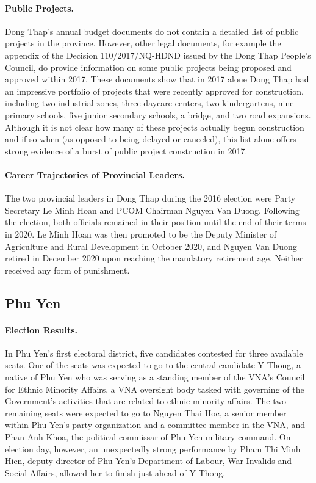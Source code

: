 \documentclass[12pt]{article}
\newcommand{\1}{\mathbbm{1}}
\begin{document}
\paragraph{Public Projects.} Dong Thap's annual budget documents do not contain a detailed list of public projects in the province. However, other legal documents, for example the appendix of the Decision 110/2017/NQ-HDND issued by the Dong Thap People's Council, do provide information on some public projects being proposed and approved within 2017. These documents show that in 2017 alone Dong Thap had an impressive portfolio of projects that were recently approved for construction, including two industrial zones, three daycare centers, two kindergartens, nine primary schools, five junior secondary schools, a bridge, and two road expansions. Although it is not clear how many of these projects actually begun construction and if so when (as opposed to being delayed or canceled), this list alone offers strong evidence of a burst of public project construction in 2017.

\paragraph{Career Trajectories of Provincial Leaders.} The two provincial leaders in Dong Thap during the 2016 election were Party Secretary Le Minh Hoan and PCOM Chairman Nguyen Van Duong. Following the election, both officials remained in their position until the end of their terms in 2020. Le Minh Hoan was then promoted to be the Deputy Minister of Agriculture and Rural Development in October 2020, and Nguyen Van Duong retired in December 2020 upon reaching the mandatory retirement age. Neither received any form of punishment.

\subsection{Phu Yen}

\paragraph{Election Results.} 

In Phu Yen's first electoral district, five candidates contested for three available seats. One of the seats was expected to go to the central candidate Y Thong, a native of Phu Yen who was serving as a standing member of the VNA's Council for Ethnic Minority Affairs, a VNA oversight body tasked with governing of the Government's activities that are related to ethnic minority affairs. The two remaining seats were expected to go to Nguyen Thai Hoc, a senior member within Phu Yen's party organization and a committee member in the VNA, and Phan Anh Khoa, the political commissar of Phu Yen military command. On election day, however, an unexpectedly strong performance by Pham Thi Minh Hien, deputy director of Phu Yen's Department of Labour, War Invalids and Social Affairs, allowed her to finish just ahead of Y Thong.
\end{document}
